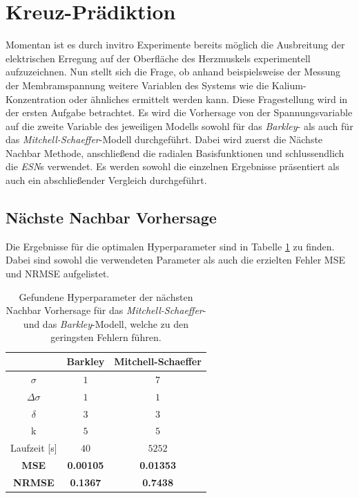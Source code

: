 \section{Kreuz-Prädiktion}
Momentan ist es durch invitro Experimente bereits möglich die Ausbreitung der elektrischen Erregung auf der Oberfläche des Herzmuskels experimentell aufzuzeichnen. Nun stellt sich die Frage, ob anhand beispielsweise der Messung der Membramspannung weitere Variablen des Systems wie die Kalium-Konzentration oder ähnliches ermittelt werden kann. Diese Fragestellung wird in der ersten Aufgabe betrachtet. Es wird die Vorhersage von der Spannungsvariable auf die zweite Variable des jeweiligen Modells sowohl für das \textit{Barkley}- als auch für das \textit{Mitchell-Schaeffer}-Modell durchgeführt. Dabei wird zuerst die Nächste Nachbar Methode, anschließend die radialen Basisfunktionen und schlussendlich die \textit{ESN}s verwendet. Es werden sowohl die einzelnen Ergebnisse präsentiert als auch ein abschließender Vergleich durchgeführt.
 
\subsection{Nächste Nachbar Vorhersage}
Die Ergebnisse für die optimalen Hyperparameter sind in Tabelle \ref{tab:exp_cross_nn_results} zu finden. Dabei sind sowohl die verwendeten Parameter als auch die erzielten Fehler MSE und NRMSE aufgelistet.
\begin{table}[h]
	\centering

	\begin{tabular}{|c|c|c|}
		\multicolumn{1}{c|}{} & Barkley & Mitchell-Schaeffer \\ 
		\hline \hline 
		\rule[-1ex]{0pt}{2.5ex} $\sigma$ & $1$ & $7$ \\ 
		\hline 
		\rule[-1ex]{0pt}{2.5ex} $\Delta \sigma$ & $1$ & $1$ \\ 
		\hline 
		\rule[-1ex]{0pt}{2.5ex} $\delta$ & $3$ & $3$ \\ 
		\hline 
		\rule[-1ex]{0pt}{2.5ex} k & $5$ & $5$ \\ 
		\hline 
		\rule[-1ex]{0pt}{2.5ex} Laufzeit [s] & $40$ & $5252$ \\ 
		\hline 
		\rule[-1ex]{0pt}{2.5ex} \textbf{MSE} & \textbf{0.00105} & \textbf{0.01353} \\ 
		\hline 
		\rule[-1ex]{0pt}{2.5ex} \textbf{NRMSE} & \textbf{0.1367} & \textbf{0.7438} \\ 
		\hline 
	\end{tabular} 

	\caption{Gefundene Hyperparameter der nächsten Nachbar Vorhersage für das \textit{Mitchell-Schaeffer}- und das \textit{Barkley}-Modell, welche zu den geringsten Fehlern führen.}
\label{tab:exp_cross_nn_results}
\end{table} 

